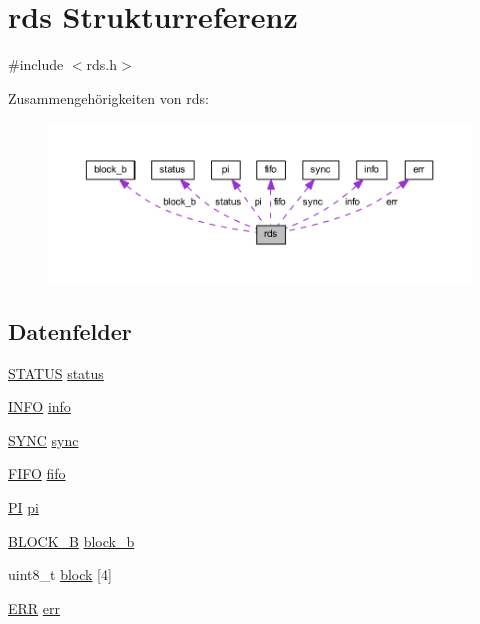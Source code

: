 \hypertarget{structrds}{}\section{rds Strukturreferenz}
\label{structrds}


{\ttfamily \#include $<$rds.\+h$>$}



Zusammengehörigkeiten von rds\+:\nopagebreak
\begin{figure}[H]
\begin{center}
\leavevmode
\includegraphics[width=350pt]{structrds__coll__graph}
\end{center}
\end{figure}
\subsection*{Datenfelder}
\begin{DoxyCompactItemize}
\item 
\hyperlink{rds_8h_ada2ef00c464f9ae8ec73e127ea6a4520}{S\+T\+A\+T\+U\+S} \hyperlink{structrds_a1025e6cbbd3179d2d91b9b4afb8f8efc}{status}
\item 
\hyperlink{rds_8h_a4d0cac7fd06c1f9b01c6a67516c95cfb}{I\+N\+F\+O} \hyperlink{structrds_a8936b68dc62d34c0bd4298d71e811a89}{info}
\item 
\hyperlink{rds_8h_a09f25e919a775a5955c4fb87155e2762}{S\+Y\+N\+C} \hyperlink{structrds_aa779e41fc5dcd8e1471033612c290b23}{sync}
\item 
\hyperlink{rds_8h_a632395f1ea2941b14cb3baef84705059}{F\+I\+F\+O} \hyperlink{structrds_a7f4b3988a39d63bbb74e44a08285d9ef}{fifo}
\item 
\hyperlink{rds_8h_a1b009a3588683496b542b777653e6c21}{P\+I} \hyperlink{structrds_a157b53b7e71fcc6afe0a4c664d7adb60}{pi}
\item 
\hyperlink{rds_8h_acde5bba1b29ae92f2d1c088cbc0e40bd}{B\+L\+O\+C\+K\+\_\+\+B} \hyperlink{structrds_ad8c59b1a87492b568b0bf85aef6f5f87}{block\+\_\+b}
\item 
uint8\+\_\+t \hyperlink{structrds_af966591bcdc65611d3f9ec47cd36d52a}{block} \mbox{[}4\mbox{]}
\item 
\hyperlink{rds_8h_aa7225a8602f1106cb23bf648d85efb2c}{E\+R\+R} \hyperlink{structrds_a533130a85d028e42078891666dd6c6fc}{err}
\end{DoxyCompactItemize}


